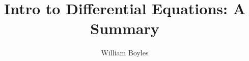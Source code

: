\documentclass[oneside, 12pt]{book}
\begin{document}
	\title{Intro to Differential Equations: A Summary}
	\author{William Boyles}
	\date{}
		
	\frontmatter
		\maketitle
		\tableofcontents
	
	\mainmatter
		
	\appendix
		
	\backmatter
\end{document}
